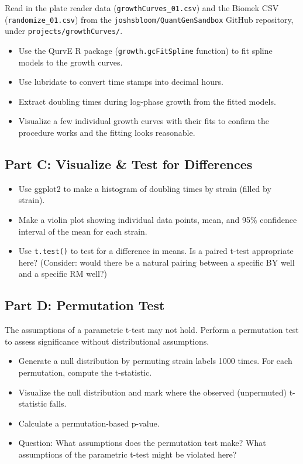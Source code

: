 Read in the plate reader data (\texttt{growthCurves\_01.csv}) and the Biomek CSV (\texttt{randomize\_01.csv}) from the \texttt{joshsbloom/QuantGenSandbox} GitHub repository, under \texttt{projects/growthCurves/}.

\begin{dobox}[Tasks]
\begin{itemize}[nosep]
  \item Use the QurvE R package (\texttt{growth.gcFitSpline} function) to fit spline models to the growth curves.
  \item Use lubridate to convert time stamps into decimal hours.
  \item Extract doubling times during log-phase growth from the fitted models.
  \item Visualize a few individual growth curves with their fits to confirm the procedure works and the fitting looks reasonable.
\end{itemize}
\end{dobox}

\subsection{Part C: Visualize \& Test for Differences}

\begin{dobox}[Tasks]
\begin{itemize}[nosep]
  \item Use ggplot2 to make a histogram of doubling times by strain (filled by strain).
  \item Make a violin plot showing individual data points, mean, and 95\% confidence interval of the mean for each strain.
  \item Use \texttt{t.test()} to test for a difference in means. Is a paired t-test appropriate here? (Consider: would there be a natural pairing between a specific BY well and a specific RM well?)
\end{itemize}
\end{dobox}

\subsection{Part D: Permutation Test}

The assumptions of a parametric t-test may not hold. Perform a permutation test to assess significance without distributional assumptions.

\begin{dobox}[Tasks]
\begin{itemize}[nosep]
  \item Generate a null distribution by permuting strain labels 1000 times. For each permutation, compute the t-statistic.
  \item Visualize the null distribution and mark where the observed (unpermuted) t-statistic falls.
  \item Calculate a permutation-based p-value.
  \item Question: What assumptions does the permutation test make? What assumptions of the parametric t-test might be violated here?
\end{itemize}
\end{dobox}

